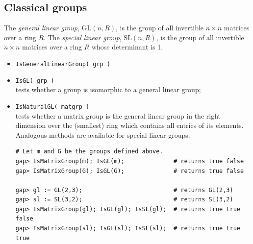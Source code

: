 \documentclass[11pt]{amsart}
\theoremstyle{plain}
\newcommand{\codesize}{\footnotesize}
\newcommand{\<}{\ensuremath{\langle}}
\renewcommand{\>}{\ensuremath{\rangle}}
\newcommand{\GL}{\ensuremath{\mathrm{GL}}}
\newcommand{\SL}{\ensuremath{\mathrm{SL}}}
\begin{document}
\subsection{Classical groups}
The \emph{general linear group}, $\GL(n, R)$, is the group of all invertible
$n\times n$ matrices over a ring $R$. 
The \emph{special linear group}, $\SL(n,R)$, is the group of all invertible $n\times
n$ matrices over a ring $R$ whose determinant is 1. 
\begin{itemize}
\item {\tt IsGeneralLinearGroup( grp )}
\item {\tt IsGL( grp )}\\
tests whether a group is isomorphic to a general linear group; 
\item {\tt IsNaturalGL( matgrp )}\\
tests whether a matrix group is the general linear group in the right dimension over the
(smallest) ring which contains all entries of its elements.
\\[4pt]
Analogous methods are available for special linear groups.
{\codesize
\begin{verbatim}
# Let m and G be the groups defined above.
gap> IsMatrixGroup(m); IsGL(m);              # returns true false
gap> IsMatrixGroup(G); IsGL(G);              # returns true false

gap> gl := GL(2,3);                          # returns GL(2,3)
gap> sl := SL(3,2);                          # returns SL(3,2)
gap> IsMatrixGroup(gl); IsGL(gl); IsSL(gl);  # returns true true false
gap> IsMatrixGroup(sl); IsGL(sl); IsSL(sl);  # returns true true true
\end{verbatim}}


\end{itemize}
\end{document}
